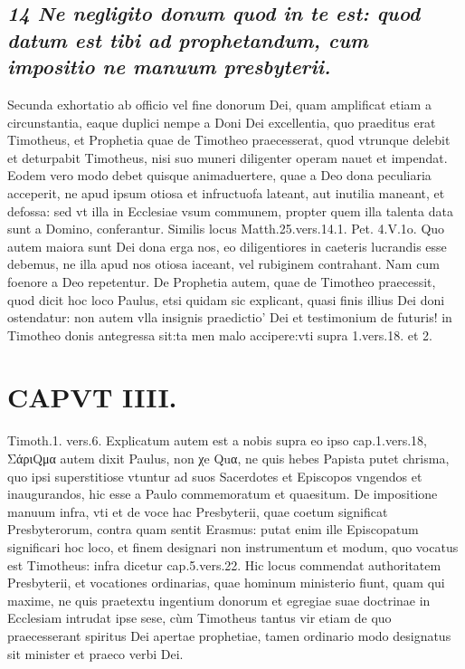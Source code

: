 \documentclass{article}
\begin{document}
\begin{pages}
\subsection*{\textit{14 Ne negligito donum quod in te est: quod datum est tibi ad prophetandum, cum impositio ne manuum presbyterii. }}\pstart Secunda exhortatio ab officio vel fine donorum Dei, quam amplificat etiam a circunstantia, eaque  duplici nempe a Doni Dei excellentia, quo praeditus erat Timotheus, et Prophetia quae de Timotheo praecesserat, quod vtrunque delebit et deturpabit Timotheus, nisi suo muneri diligenter operam nauet et impendat. Eodem vero modo debet quisque animaduertere, quae a Deo dona peculiaria acceperit, ne apud ipsum otiosa et infructuofa lateant, aut inutilia maneant, et defossa: sed vt illa in Ecclesiae vsum communem, propter quem illa talenta data sunt a Domino, conferantur.  \pend\pstart Similis locus Matth.25.vers.14.1. Pet. 4.V.1o.  \pend\pstart Quo autem maiora sunt Dei dona erga nos, eo diligentiores in caeteris lucrandis esse debemus, ne illa apud nos otiosa iaceant, vel rubiginem contrahant. Nam cum foenore a Deo repetentur.  \pend\pstart De Prophetia autem, quae de Timotheo praecessit, quod dicit hoc loco Paulus, etsi quidam sic explicant, quasi finis illius Dei doni ostendatur: non autem vlla insignis praedictio' Dei et testimonium de futuris! in Timotheo donis antegressa sit:ta men malo accipere:vti supra 1.vers.18. et 2.  \pend
\section*{CAPVT  IIII. }
\marginpar{[ p.235 ]}\pstart Timoth.1. vers.6. Explicatum autem est a nobis supra eo ipso cap.1.vers.18,  \pend\pstart ΣάριQμα autem dixit Paulus, non χe Quα, ne quis hebes Papista putet chrisma, quo ipsi superstitiose vtuntur ad suos Sacerdotes et Episcopos vngendos et inaugurandos, hic esse a Paulo commemoratum et quaesitum.  \pend\pstart De impositione manuum infra, vti et de voce hac Presbyterii, quae coetum significat Presbyterorum, contra quam sentit Erasmus: putat enim ille Episcopatum significari hoc loco, et finem designari non instrumentum et modum, quo vocatus est Timotheus: infra dicetur cap.5.vers.22.  \pend\pstart Hic locus commendat authoritatem Presbyterii, et vocationes ordinarias, quae hominum ministerio fiunt, quam qui maxime, ne quis praetextu ingentium donorum et egregiae suae doctrinae in Ecclesiam intrudat ipse sese, cùm Timotheus tantus vir etiam de quo praecesserant spiritus Dei apertae prophetiae, tamen ordinario modo designatus sit minister et praeco verbi Dei.  \pend
{}
{}

\end{pages}
\end{document}
